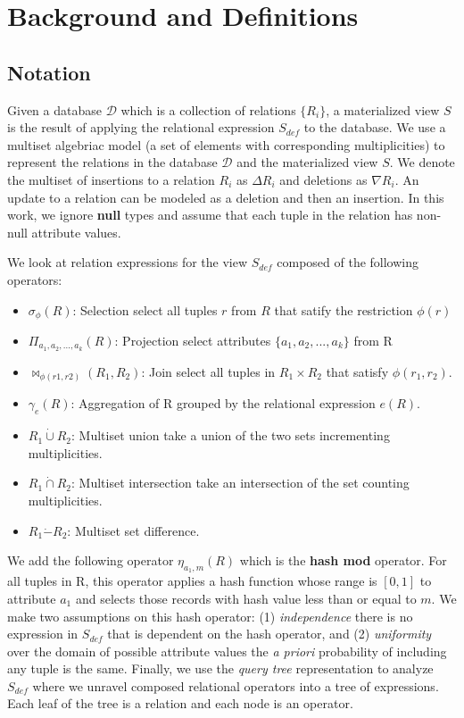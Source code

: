 \section{Background and Definitions}\label{sec-background}
\vspace{-.5em}
\subsection{Notation}
Given a database $\mathcal{D}$ which is a collection of relations $\{R_i\}$, a materialized view $S$ is the result of applying the relational expression $S_{def}$ to the database.
We use a multiset algebriac model (a set of elements with corresponding multiplicities) to represent the relations in the database $\mathcal{D}$ and the materialized view $S$.
We denote the multiset of insertions to a relation $R_i$ as $\Delta R_i$ and deletions as $\nabla R_i$. 
An update to a relation can be modeled as a deletion and then an insertion.
In this work, we ignore \textbf{null} types and assume that each tuple in the relation has non-null attribute values.

We look at relation expressions for the view $S_{def}$ composed of the following operators:
\begin{itemize}\vspace{-.45em}
\item $\sigma_{\phi}(R)$: Selection select all tuples $r$ from $R$ that satify the restriction $\phi (r)$ \vspace{-.45em}
\item $\Pi_{a_1,a_2,...,a_k}(R)$: Projection select attributes $\{a_1,a_2,...,a_k\}$ from R \vspace{-.45em}
\item $\bowtie_{\phi (r1,r2)}(R_1,R_2)$: Join select all tuples in $R_1 \times R_2$ that satisfy $\phi (r_1,r_2)$.
\item $\gamma_{e}(R)$: Aggregation of R grouped by the relational expression $e(R)$.\vspace{-.45em}
\item $R_1 \dot{\cup} R_2$: Multiset union take a union of the two sets incrementing multiplicities.
\item $R_1 \dot{\cap} R_2$: Multiset intersection take an intersection of the set counting multiplicities.
\item $R_1 \dot{-} R_2$: Multiset set difference.
\end{itemize}
We add the following operator $\eta_{a_1, m}(R)$ which is the \textbf{hash mod} operator.
For all tuples in R, this operator applies a hash function whose range is $[0,1]$ to attribute $a_1$ and selects those records with hash value less than or equal to $m$.
We make two assumptions on this hash operator: (1) \emph{independence} there is no expression in $S_{def}$ that is dependent on the hash operator, and (2) \emph{uniformity} over the domain of possible attribute values the \emph{a priori} probability of including any tuple is the same.
Finally, we use the \emph{query tree} representation to analyze $S_{def}$ where we unravel composed relational operators into a tree of expressions.
Each leaf of the tree is a relation and each node is an operator.

